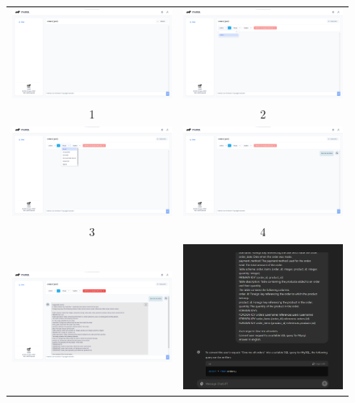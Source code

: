\begin{figure}[H]
  \begin{tabular}{cc}
    \includegraphics[width=65mm]{assets/workflow_1.png} &   \includegraphics[width=65mm]{assets/workflow_2.png} \\
    1 & 2 \\[6pt]
     \includegraphics[width=65mm]{assets/workflow_3.png} &   \includegraphics[width=65mm]{assets/workflow_4.png} \\
    3 & 4 \\[6pt]
     \includegraphics[width=65mm]{assets/workflow_5.png} &   \includegraphics[width=65mm]{assets/workflow_6.png} \\

\end{tabular}
\end{figure}
